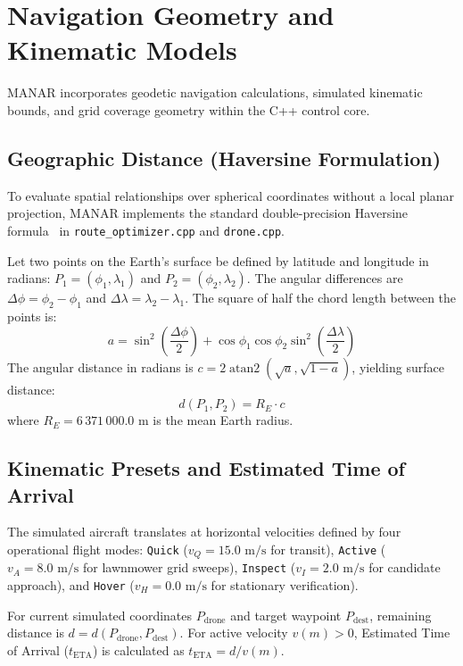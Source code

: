 \section{Navigation Geometry and Kinematic Models}

MANAR incorporates geodetic navigation calculations, simulated kinematic bounds, and grid coverage geometry within the C++ control core.

\subsection{Geographic Distance (Haversine Formulation)}
To evaluate spatial relationships over spherical coordinates without a local planar projection, MANAR implements the standard double-precision Haversine formula~\cite{sinnott1984haversine} in \texttt{route\_optimizer.cpp} and \texttt{drone.cpp}.

Let two points on the Earth's surface be defined by latitude and longitude in radians: $P_1 = (\phi_1, \lambda_1)$ and $P_2 = (\phi_2, \lambda_2)$. The angular differences are $\Delta\phi = \phi_2 - \phi_1$ and $\Delta\lambda = \lambda_2 - \lambda_1$. The square of half the chord length between the points is:
\begin{equation}
a = \sin^2\left(\frac{\Delta\phi}{2}\right) + \cos\phi_1 \cos\phi_2 \sin^2\left(\frac{\Delta\lambda}{2}\right)
\end{equation}
The angular distance in radians is $c = 2 \operatorname{atan2}\left(\sqrt{a}, \sqrt{1 - a}\right)$, yielding surface distance:
\begin{equation}
d(P_1, P_2) = R_E \cdot c
\end{equation}
where $R_E = 6\,371\,000.0\text{ m}$ is the mean Earth radius.

\subsection{Kinematic Presets and Estimated Time of Arrival}
The simulated aircraft translates at horizontal velocities defined by four operational flight modes: \texttt{Quick} ($v_Q = 15.0\text{ m/s}$ for transit), \texttt{Active} ($v_A = 8.0\text{ m/s}$ for lawnmower grid sweeps), \texttt{Inspect} ($v_I = 2.0\text{ m/s}$ for candidate approach), and \texttt{Hover} ($v_H = 0.0\text{ m/s}$ for stationary verification).

For current simulated coordinates $P_{\mathrm{drone}}$ and target waypoint $P_{\mathrm{dest}}$, remaining distance is $d = d(P_{\mathrm{drone}}, P_{\mathrm{dest}})$. For active velocity $v(m) > 0$, Estimated Time of Arrival ($t_{\mathrm{ETA}}$) is calculated as $t_{\mathrm{ETA}} = d / v(m)$.

